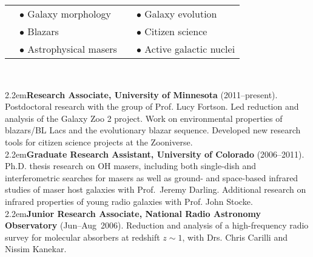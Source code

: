 
\medskip
{}
\vskip2pt
\medskip
\begin{tabular}{llll}
\hspace{50pt} & {$\bullet$ \large Galaxy morphology}  & \hspace{50pt} & {$\bullet$ \large Galaxy evolution}             \\
\hspace{50pt} & {$\bullet$ \large Blazars}        & \hspace{50pt} & {$\bullet$ \large Citizen science} \\
\hspace{50pt} & {$\bullet$ \large Astrophysical masers }   & \hspace{50pt} & {$\bullet$ \large Active galactic nuclei}          \\
\end{tabular}

\medskip\medskip
{}\\
\medskip

\hangindent2.2em{\large {\bf{\sc Research Associate}, University of Minnesota} (2011--present)}.  Postdoctoral research with the group of Prof. Lucy Fortson. Led reduction and analysis of the Galaxy Zoo 2 project. Work on environmental properties of blazars/BL Lacs and the evolutionary blazar sequence. Developed new research tools for citizen science projects at the Zooniverse. \\[4pt]
\hangindent2.2em{\large {\bf{\sc Graduate Research Assistant}, University of Colorado} (2006--2011)}.  Ph.D. thesis research on OH masers, including both single-dish and interferometric searches for masers as well as ground- and space-based infrared studies of maser host galaxies with Prof.~Jeremy Darling. Additional research on infrared properties of young radio galaxies with Prof. John Stocke.\\[4pt]

\hangindent2.2em{\large {\bf{\sc Junior Research Associate}, National Radio Astronomy Observatory} (Jun--Aug~2006)}. Reduction and analysis of a high-frequency radio survey for molecular absorbers at redshift $z\sim1$, with Drs. Chris Carilli and Nissim Kanekar. \\[4pt]

